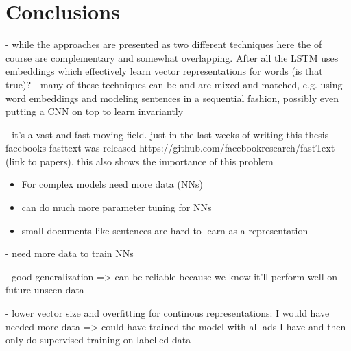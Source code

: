 
\clearpage

\section{Conclusions}
\label{sec:Conclusions}


- while the approaches are presented as two different techniques here the of course are complementary and somewhat overlapping. After all the LSTM uses embeddings which effectively learn vector representations for words (is that true)?
- many of these techniques can be and are mixed and matched, e.g. using word embeddings and modeling sentences in a sequential fashion, possibly even putting a CNN on top to learn invariantly

- it's a vast and fast moving field. just in the last weeks of writing this thesis facebooks fasttext was released https://github.com/facebookresearch/fastText (link to papers). this also shows the importance of this problem

\begin{itemize}
  \item For complex models need more data (NNs)
  \item can do much more parameter tuning for NNs
  \item small documents like sentences are hard to learn as a representation
\end{itemize}

- need more data to train NNs

- good generalization => can be reliable because we know it'll perform well on future unseen data


- lower vector size and overfitting for continous representations: I would have needed more data => could have trained the model with all ads I have and then only do supervised training on labelled data

